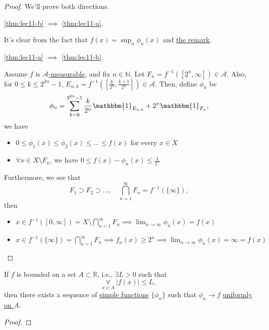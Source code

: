 \begin{proof}
	We'll prove both directions.
	\begin{claim}
		\autoref{thm:lec11-b} \(\implies \) \autoref{thm:lec11-a}.
	\end{claim}
	\begin{explanation}
		It's clear from the fact that \(f(x) = \sup_n \phi _{n}(x)\) and \hyperref[rmk:Operations-preserve-measurability]{the remark}.
	\end{explanation}

	\begin{claim}
		\autoref{thm:lec11-a} \(\implies \) \autoref{thm:lec11-b}.
	\end{claim}
	\begin{explanation}
		Assume \(f\) is \hyperref[def:A-measurable-function]{\(\mathcal{A} \)-measurable}, and fix \(n\in\mathbb{N} \). Let \(F_{n} =f^{-1} ([2^n, \infty ])\in \mathcal{A}\). Also, for \(0\leq k\leq 2^{2n}-1\), \(E_{n, k} = f^{-1} \left(\left[\frac{k}{2^n}, \frac{k+1}{2^n}\right]\right)\in \mathcal{A} \). Then, define \(\phi _{n}\) be
		\[
			\phi _{n} = \sum_{k=0}^{2^{2n} - 1}\frac{k}{2^n}\mathbbm{1}_{E_{n, k}}  + 2^n \mathbbm{1}_{F_n},
		\]
		we have
		\begin{itemize}
			\item \(0\leq \phi _1(x)\leq \phi _2(x)\leq \dots \leq f(x) \) for every \(x\in X\)
			\item \(\forall x\in X\setminus F_{n}\), we have \(0\leq f(x) - \phi _{n}(x)\leq \frac{1}{2^n}\)
		\end{itemize}

		Furthermore, we see that
		\[
			F_1\supset F_2\supset \dots ,\quad \bigcap_{n=1}^{\infty} F_{n} = f^{-1} (\{\infty \}),
		\]
		then
		\begin{itemize}
			\item \(x\in f^{-1} ([0, \infty ]) = X\setminus \bigcap_{n=1}^{\infty} F_{n} \implies \lim_{n \to \infty} \phi _{n}(x) = f(x)\)
			\item \(x\in f^{-1} (\{\infty \}) = \bigcap_{n=1}^{\infty} F_{n}\implies f_{n}(x)\geq 2^n \implies \lim_{n \to \infty} \phi _{n}(x) = \infty = f(x)\)
		\end{itemize}
	\end{explanation}
\end{proof}

\begin{corollary}
	If \(f\) is bounded on a set \(A\subset \mathbb{R} \), i.e., \(\exists L > 0 \) such that
	\[
		\underset{x\in A}{\forall }\ \left\vert f(x) \right\vert \leq L,
	\]
	then there exists a sequence of \hyperref[def:simple-function]{simple functions} \(\{\phi _{n}\}\) such that \(\phi _{n}\to f \) \underline{\hyperref[def:uniformly-convergence]{uniformly} on \(A\)}.
\end{corollary}
\begin{proof}
\end{proof}

